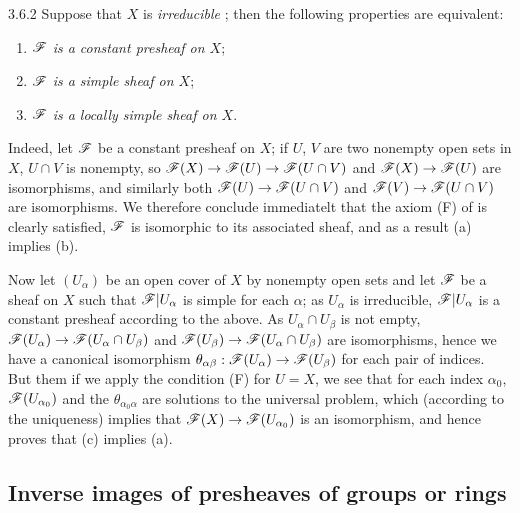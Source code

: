 \begin{env}{3.6.2}
\label{env-0.3.6.2}
Suppose that $X$ is \emph{irreducible} ; then the following properties are
equivalent:
\begin{enumerate}[label=(\alph*)]
  \item \emph{$\mathscr{F}$ is a constant presheaf on $X$};
  \item \emph{$\mathscr{F}$ is a simple sheaf on $X$};
  \item \emph{$\mathscr{F}$ is a locally simple sheaf on $X$}.
\end{enumerate}
\end{env}

Indeed, let $\mathscr{F}$ be a constant presheaf on $X$; if $U$, $V$ are two nonempty open sets in
$X$, $U\cap V$ is nonempty, so $\mathscr{F}(X)\to\mathscr{F}(U)\to\mathscr{F}(U\cap V)$ and
$\mathscr{F}(X)\to\mathscr{F}(U)$ are isomorphisms, and similarly both
$\mathscr{F}(U)\to\mathscr{F}(U\cap V)$ and $\mathscr{F}(V)\to\mathscr{F}(U\cap V)$ are isomorphisms. We
therefore conclude immediatelt that the axiom (F) of  is clearly satisfied,
$\mathscr{F}$ is isomorphic to its associated sheaf, and as a result (a) implies (b).

Now let $(U_\alpha)$ be an open cover of $X$ by nonempty open sets and let $\mathscr{F}$ be a
sheaf on $X$ such that $\mathscr{F}|U_\alpha$ is simple for each $\alpha$; as $U_\alpha$ is
irreducible, $\mathscr{F}|U_\alpha$ is a constant presheaf according to the above. As
$U_\alpha\cap U_\beta$ is not empty, $\mathscr{F}(U_\alpha)\to\mathscr{F}(U_\alpha\cap U_\beta)$ and
$\mathscr{F}(U_\beta)\to\mathscr{F}(U_\alpha\cap U_\beta)$ are isomorphisms, hence we have a canonical
isomorphism $\theta_{\alpha\beta}:\mathscr{F}(U_\alpha)\to\mathscr{F}(U_\beta)$ for each pair of
indices. But them if we apply the condition (F) for $U=X$, we see that for each index
$\alpha_0$, $\mathscr{F}(U_{\alpha_0})$ and the $\theta_{\alpha_0\alpha}$ are solutions to the
universal problem, which (according to the uniqueness) implies that
$\mathscr{F}(X)\to\mathscr{F}(U_{\alpha_0})$ is an isomorphism, and hence proves that (c) implies (a).

\subsection{Inverse images of presheaves of groups or rings}
\label{0-prelim-3.7}

